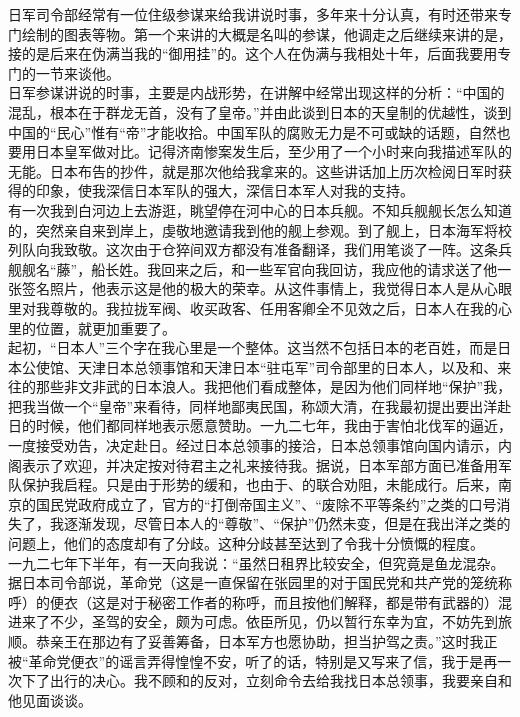 日军司令部经常有一位住级参谋来给我讲说时事，多年来十分认真，有时还带来专门绘制的图表等物。第一个来讲的大概是名叫的参谋，他调走之后继续来讲的是，接的是后来在伪满当我的“御用挂”的。这个人在伪满与我相处十年，后面我要用专门的一节来谈他。\\

日军参谋讲说的时事，主要是内战形势，在讲解中经常出现这样的分析：“中国的混乱，根本在于群龙无首，没有了皇帝。”并由此谈到日本的天皇制的优越性，谈到中国的“民心”惟有“帝”才能收拾。中国军队的腐败无力是不可或缺的话题，自然也要用日本皇军做对比。记得济南惨案发生后，至少用了一个小时来向我描述军队的无能。日本布告的抄件，就是那次他给我拿来的。这些讲话加上历次检阅日军时获得的印象，使我深信日本军队的强大，深信日本军人对我的支持。\\

有一次我到白河边上去游逛，眺望停在河中心的日本兵舰。不知兵舰舰长怎么知道的，突然亲自来到岸上，虔敬地邀请我到他的舰上参观。到了舰上，日本海军将校列队向我致敬。这次由于仓猝间双方都没有准备翻译，我们用笔谈了一阵。这条兵舰舰名“藤”，船长姓。我回来之后，和一些军官向我回访，我应他的请求送了他一张签名照片，他表示这是他的极大的荣幸。从这件事情上，我觉得日本人是从心眼里对我尊敬的。我拉拢军阀、收买政客、任用客卿全不见效之后，日本人在我的心里的位置，就更加重要了。\\

起初，“日本人”三个字在我心里是一个整体。这当然不包括日本的老百姓，而是日本公使馆、天津日本总领事馆和天津日本“驻屯军”司令部里的日本人，以及和、来往的那些非文非武的日本浪人。我把他们看成整体，是因为他们同样地“保护”我，把我当做一个“皇帝”来看待，同样地鄙夷民国，称颂大清，在我最初提出要出洋赴日的时候，他们都同样地表示愿意赞助。一九二七年，我由于害怕北伐军的逼近，一度接受劝告，决定赴日。经过日本总领事的接洽，日本总领事馆向国内请示，内阁表示了欢迎，并决定按对待君主之礼来接待我。据说，日本军部方面已准备用军队保护我启程。只是由于形势的缓和，也由于、的联合劝阻，未能成行。后来，南京的国民党政府成立了，官方的“打倒帝国主义”、“废除不平等条约”之类的口号消失了，我逐渐发现，尽管日本人的“尊敬”、“保护”仍然未变，但是在我出洋之类的问题上，他们的态度却有了分歧。这种分歧甚至达到了令我十分愤慨的程度。\\

一九二七年下半年，有一天向我说：“虽然日租界比较安全，但究竟是鱼龙混杂。据日本司令部说，革命党（这是一直保留在张园里的对于国民党和共产党的笼统称呼）的便衣（这是对于秘密工作者的称呼，而且按他们解释，都是带有武器的）混进来了不少，圣驾的安全，颇为可虑。依臣所见，仍以暂行东幸为宜，不妨先到旅顺。恭亲王在那边有了妥善筹备，日本军方也愿协助，担当护驾之责。”这时我正被“革命党便衣”的谣言弄得惶惶不安，听了的话，特别是又写来了信，我于是再一次下了出行的决心。我不顾和的反对，立刻命令去给我找日本总领事，我要亲自和他见面谈谈。\\


